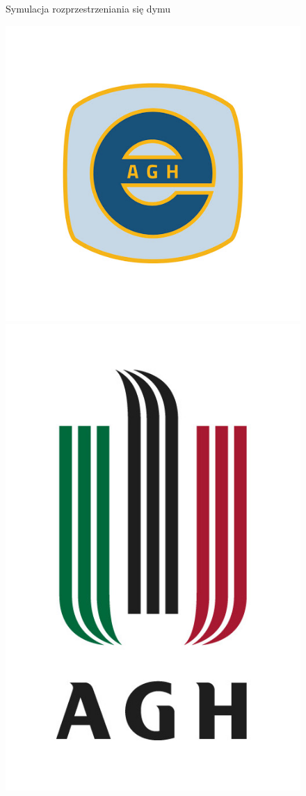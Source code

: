 \documentclass{article}
\date{}
\begin{document}
    \begin{figure}[h]
        \centering
        \Huge{Symulacja rozprzestrzeniania się dymu}
        \vspace{15mm}
        
        \includegraphics[scale = 0.23]{eaiib.jpg}
        \includegraphics[scale = 0.5]{agh.jpg}

\end{figure}
\end{document}
